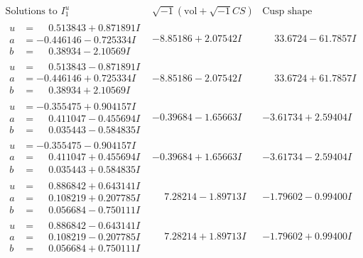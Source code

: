 \documentclass[1p]{elsarticle_modified}
\theoremstyle{definition}
\newcommand{\I}{\sqrt{-1}}
\begin{document}
$$\begin{array}{c|c|c}  
\text{Solutions to }I^u_{1}& \I (\text{vol} + \sqrt{-1}CS) & \text{Cusp shape}\\
 \hline 
\begin{aligned}
u &= \phantom{-}0.513843 + 0.871891 I \\
a &= -0.446146 - 0.725334 I \\
b &= \phantom{-}0.38934 - 2.10569 I\end{aligned}
 & -8.85186 + 2.07542 I & \phantom{-}33.6724 - 61.7857 I \\ \hline\begin{aligned}
u &= \phantom{-}0.513843 - 0.871891 I \\
a &= -0.446146 + 0.725334 I \\
b &= \phantom{-}0.38934 + 2.10569 I\end{aligned}
 & -8.85186 - 2.07542 I & \phantom{-}33.6724 + 61.7857 I \\ \hline\begin{aligned}
u &= -0.355475 + 0.904157 I \\
a &= \phantom{-}0.411047 - 0.455694 I \\
b &= \phantom{-}0.035443 - 0.584835 I\end{aligned}
 & -0.39684 - 1.65663 I & -3.61734 + 2.59404 I \\ \hline\begin{aligned}
u &= -0.355475 - 0.904157 I \\
a &= \phantom{-}0.411047 + 0.455694 I \\
b &= \phantom{-}0.035443 + 0.584835 I\end{aligned}
 & -0.39684 + 1.65663 I & -3.61734 - 2.59404 I \\ \hline\begin{aligned}
u &= \phantom{-}0.886842 + 0.643141 I \\
a &= \phantom{-}0.108219 + 0.207785 I \\
b &= \phantom{-}0.056684 - 0.750111 I\end{aligned}
 & \phantom{-}7.28214 - 1.89713 I & -1.79602 - 0.99400 I \\ \hline\begin{aligned}
u &= \phantom{-}0.886842 - 0.643141 I \\
a &= \phantom{-}0.108219 - 0.207785 I \\
b &= \phantom{-}0.056684 + 0.750111 I\end{aligned}
 & \phantom{-}7.28214 + 1.89713 I & -1.79602 + 0.99400 I \\ \hline\begin{aligned}

\end{aligned}
\end{array}$$
\end{document}
